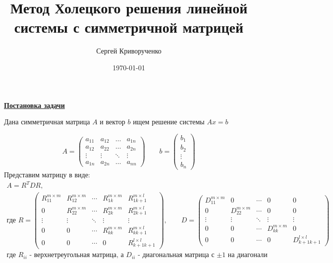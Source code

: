 \documentclass[a4paper,12pt]{article}
\begin{document}
\renewcommand{\theequation}{1.\arabic{equation}}
\author{Сергей Криворученко}
\title{Метод Холецкого решения линейной системы с симметричной матрицей}
\date{\today}
\maketitle

\begin{center}
{\bfseries \Large\underline{Постановка задачи}}
\end{center}

Дана симметричная матрица $A$ и вектор $b$ ищем решение системы $Ax = b$

$$
A=
  \begin{pmatrix}
    a_{11}& a_{12} &\ldots & a_{1n} \\
    a_{12}& a_{22} &\ldots & a_{2n} \\
    \vdots& \vdots &\ddots & \vdots\\
    a_{1n}& a_{2n} &\ldots & a_{nn}
  \end{pmatrix}
\qquad
b=
  \begin{pmatrix}
    b_{1} \\
    b_{2} \\
    \vdots \\
    b_{n}
  \end{pmatrix}
$$
Представим матрицу в виде:
$$
\begin{gathered}
A=R^T D R, \\
\text{где } R=
\begin{pmatrix}
    R_{11}^{m \times m} & R_{12}^{m \times m} & \cdots & R_{1k}^{m \times m} & R_{1k+1}^{m \times l} \\
    0 & R_{22}^{m \times m} & \cdots & R_{2k}^{m \times m} & R_{2k+1}^{m \times l} \\
    \vdots & \vdots & \ddots & \vdots & \vdots \\
    0 & 0 & \cdots & R_{kk}^{m \times m} & R_{kk+1}^{m \times l} \\
    0 & 0 & \cdots & 0 & R_{k+1k+1}^{l \times l}
\end{pmatrix},
\qquad
D=
\begin{pmatrix}
  D_{11}^{m \times m} & 0 & \cdots & 0 & 0 \\
  0 & D_{22}^{m \times m} & \cdots & 0 & 0 \\
  \vdots & \vdots & \ddots & \vdots & \vdots \\
  0 & 0 & \cdots & D_{kk}^{m \times m} & 0 \\
  0 & 0 & \cdots & 0 & D_{k+1k+1}^{l \times l}
\end{pmatrix} \\
\text{где $R_{ii}$ - верхнетреугольная матрица, а $D_{ii}$ - диагональная матрица с $\pm1$ на диагонали}
\end{gathered}
$$
\end{document}
